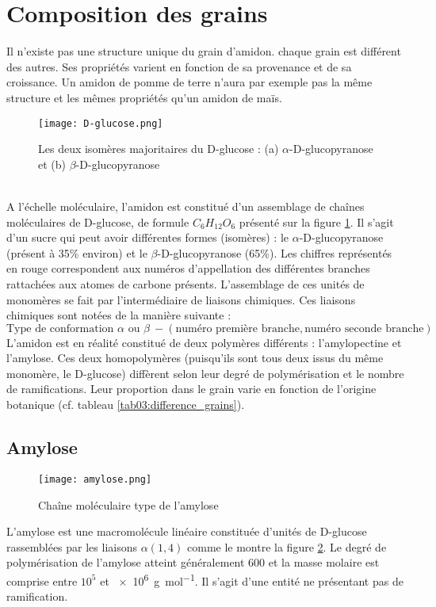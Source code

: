 \section*{Composition des grains}
	Il n'existe pas une structure unique du grain d'amidon. chaque grain est différent des autres. Ses propriétés varient en fonction de sa provenance et de sa croissance. Un amidon de pomme de terre n'aura par exemple pas la même structure et les mêmes propriétés qu'un amidon de maïs.
	\begin{figure}\begin{center}
			\texttt{[image: D-glucose.png]}
			\caption{\label{fig03:D-glucose}Les deux isomères majoritaires du D-glucose : (a) $\alpha$-D-glucopyranose et (b) $\beta$-D-glucopyranose}
	\end{center}\end{figure}
	\\A l'échelle moléculaire, l'amidon est constitué d'un assemblage de chaînes moléculaires de D-glucose, de formule $C_6H_{12}O_6$ présenté sur la figure \ref{fig03:D-glucose}. Il s'agit d'un sucre qui peut avoir différentes formes (isomères) : le $\alpha$-D-glucopyranose (présent à 35\% environ) et le $\beta$-D-glucopyranose (65\%). Les chiffres représentés en rouge correspondent aux numéros d'appellation des différentes branches rattachées aux atomes de carbone présents. L'assemblage de ces unités de monomères se fait par l'intermédiaire de liaisons chimiques. Ces liaisons chimiques sont notées de la manière suivante : $$ \text{Type de conformation }\alpha\text{ ou }\beta\ -\left(\text{numéro première branche},\text{numéro seconde branche}\right) $$
	L'amidon est en réalité constitué de deux polymères différents : l'amylopectine et l'amylose. Ces deux homopolymères (puisqu'ils sont tous deux issus du même monomère, le D-glucose) diffèrent selon leur degré de polymérisation et le nombre de ramifications. Leur proportion dans le grain varie en fonction de l'origine botanique (cf. tableau \ref{tab03:difference_grains}).
	\subsection*{Amylose}
		\begin{figure}\begin{center}
				\texttt{[image: amylose.png]}
				\caption{\label{fig03:amylose}Chaîne moléculaire type de l'amylose}
		\end{center}\end{figure}
		L'amylose est une macromolécule linéaire constituée d'unités de D-glucose rassemblées par les liaisons $\alpha(1,4)$ comme le montre la figure \ref{fig03:amylose}. Le degré de polymérisation de l'amylose atteint généralement 600 et la masse molaire est comprise entre $10^5$ et \SI{e6}{\gram\per\mole}. Il s'agit d'une entité ne présentant pas de ramification.
